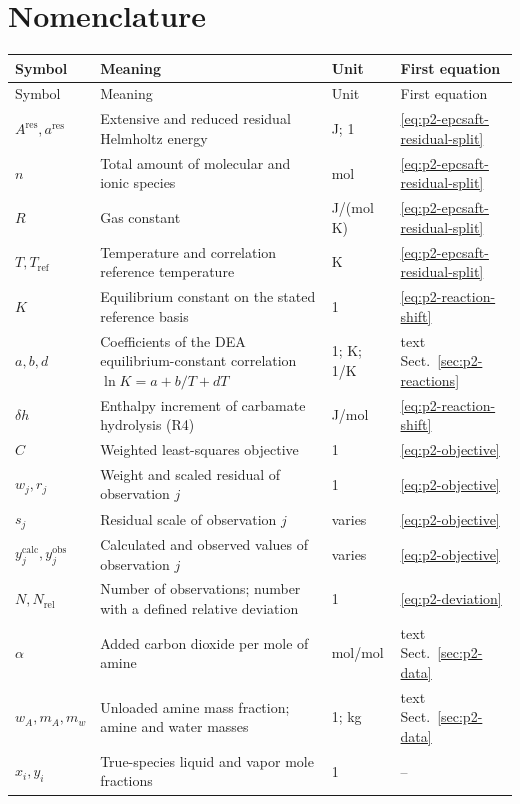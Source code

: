 \section*{Nomenclature}
\begingroup\small
\begin{longtable}{@{}p{.21\linewidth}p{.43\linewidth}p{.14\linewidth}p{.15\linewidth}@{}}
\toprule
Symbol & Meaning & Unit & First equation \\
\midrule\endfirsthead
\toprule Symbol & Meaning & Unit & First equation \\
\midrule\endhead
\bottomrule\endfoot
$A^{\mathrm{res}},a^{\mathrm{res}}$ & Extensive and reduced residual Helmholtz energy & J; 1 & \ref{eq:p2-epcsaft-residual-split} \\
$n$ & Total amount of molecular and ionic species & mol & \ref{eq:p2-epcsaft-residual-split} \\
$R$ & Gas constant & J/(mol K) & \ref{eq:p2-epcsaft-residual-split} \\
$T,T_{\mathrm{ref}}$ & Temperature and correlation reference temperature & K & \ref{eq:p2-epcsaft-residual-split} \\
$K$ & Equilibrium constant on the stated reference basis & 1 & \ref{eq:p2-reaction-shift} \\
$a,b,d$ & Coefficients of the DEA equilibrium-constant correlation $\ln K=a+b/T+dT$ & 1; K; 1/K & text Sect.~\ref{sec:p2-reactions} \\
$\delta h$ & Enthalpy increment of carbamate hydrolysis (R4) & J/mol & \ref{eq:p2-reaction-shift} \\
$C$ & Weighted least-squares objective & 1 & \ref{eq:p2-objective} \\
$w_j,r_j$ & Weight and scaled residual of observation $j$ & 1 & \ref{eq:p2-objective} \\
$s_j$ & Residual scale of observation $j$ & varies & \ref{eq:p2-objective} \\
$y_j^{\mathrm{calc}},y_j^{\mathrm{obs}}$ & Calculated and observed values of observation $j$ & varies & \ref{eq:p2-objective} \\
$N,N_{\mathrm{rel}}$ & Number of observations; number with a defined relative deviation & 1 & \ref{eq:p2-deviation} \\
$\alpha$ & Added carbon dioxide per mole of amine & mol/mol & text Sect.~\ref{sec:p2-data} \\
$w_A,m_A,m_w$ & Unloaded amine mass fraction; amine and water masses & 1; kg & text Sect.~\ref{sec:p2-data} \\
$x_i,y_i$ & True-species liquid and vapor mole fractions & 1 & -- \\

\end{longtable}
